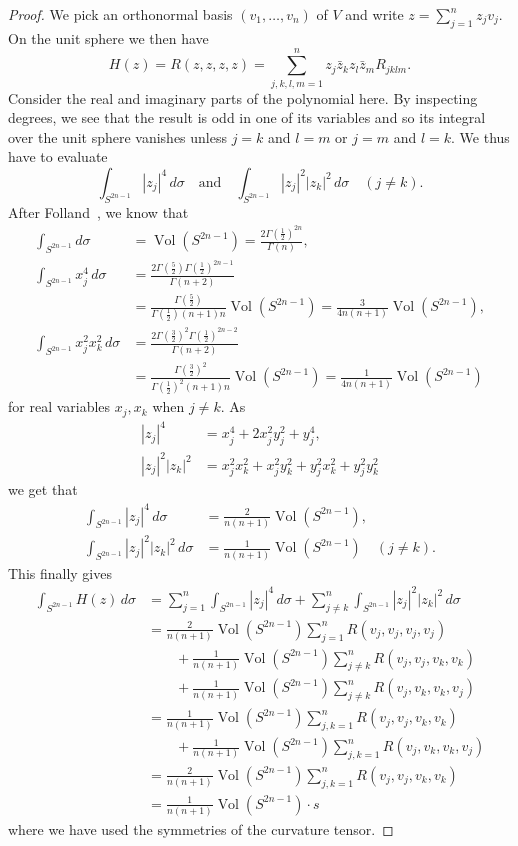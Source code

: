 \documentclass[11pt]{article}
\newtheorem*{proof}{Proof}
\DeclareMathOperator{\Vol}{Vol}
\begin{document}
\begin{proof}
  We pick an orthonormal basis $(v_1,\ldots,v_n)$ of $V$ and write $z = \sum_{j=1}^n z_j v_j$. On the unit sphere we then have
$$
H(z)
= R(z,z,z,z)
= \sum_{j,k,l,m=1}^n z_j \bar z_k z_l \bar z_m R_{jklm}.
$$
Consider the real and imaginary parts of the polynomial here. By inspecting degrees, we see that the result is odd in one of its variables and so its integral over the unit sphere vanishes unless $j = k$ and $l = m$ or $j = m$ and $l = k$. We thus have to evaluate
$$
\int_{S^{2n-1}} |z_j|^4 \, d\sigma
\quad\text{and}\quad
\int_{S^{2n-1}} |z_j|^2 |z_k|^2 \, d\sigma
\quad(j \not= k).
$$
After Folland~\cite{folland}, we know that
\begin{align*}
\int_{S^{2n-1}} d\sigma
&= \Vol(S^{2n-1}) = \frac{2\Gamma(\tfrac12)^{2n}}{\Gamma(n)},
\\
\int_{S^{2n-1}} x_j^4 \, d\sigma
&= \frac{2\Gamma(\tfrac 52)\Gamma(\tfrac 12)^{2n-1}}{\Gamma(n+2)}
\\
&= \frac{\Gamma(\tfrac52)}{\Gamma(\tfrac12)(n+1)n} \Vol(S^{2n-1})
= \frac{3}{4n(n+1)} \Vol(S^{2n-1}),
\\
\int_{S^{2n-1}} x_j^2 x_k^2 \, d\sigma
&= \frac{2\Gamma(\tfrac32)^2\Gamma(\tfrac 12)^{2n-2}}{\Gamma(n+2)}
\\
&= \frac{\Gamma(\tfrac32)^2}{\Gamma(\tfrac12)^2 (n+1)n} \Vol(S^{2n-1})
= \frac{1}{4n(n+1)} \Vol(S^{2n-1})
\end{align*}
for real variables $x_j, x_k$ when $j \not= k$. As
\begin{align*}
|z_j|^4 &= x_j^4 + 2 x_j^2 y_j^2 + y_j^4,
\\
|z_j|^2 |z_k|^2 &= x_j^2 x_k^2 + x_j^2 y_k^2 + y_j^2 x_k^2 + y_j^2 y_k^2
\end{align*}
we get that
\begin{align*}
\int_{S^{2n-1}} |z_j|^4 \, d\sigma
&= \frac{2}{n(n+1)} \Vol(S^{2n-1}),
\\
\int_{S^{2n-1}} |z_j|^2 |z_k|^2 \, d\sigma
&= \frac{1}{n(n+1)} \Vol(S^{2n-1})
\quad(j \not= k).
\end{align*}
This finally gives
\begin{align*}
\int_{S^{2n-1}} H(z) \,d\sigma
&= \sum_{j=1}^n \int_{S^{2n-1}} |z_j|^4 \, d\sigma
+ \sum_{j \not= k}^n \int_{S^{2n-1}} |z_j|^2|z_k|^2 \, d\sigma
\\
&= \frac{2}{n(n+1)} \Vol(S^{2n-1}) \sum_{j=1}^n R(v_j,v_j,v_j,v_j)
\\
&\qquad{}+ \frac{1}{n(n+1)} \Vol(S^{2n-1}) \sum_{j \not= k}^n R(v_j,v_j,v_k,v_k)
\\
&\qquad{}+
\frac{1}{n(n+1)} \Vol(S^{2n-1}) \sum_{j \not= k}^n R(v_j,v_k,v_k,v_j)
\\
&= \frac{1}{n(n+1)} \Vol(S^{2n-1}) \sum_{j,k=1}^n R(v_j,v_j,v_k,v_k)
\\
&\qquad{}+
\frac{1}{n(n+1)} \Vol(S^{2n-1}) \sum_{j,k=1}^n R(v_j,v_k,v_k,v_j)
\\
&= \frac{2}{n(n+1)} \Vol(S^{2n-1}) \sum_{j,k=1}^n R(v_j,v_j,v_k,v_k)
\\
&= \frac{1}{n(n+1)} \Vol(S^{2n-1}) \cdot s
\end{align*}
where we have used the symmetries of the curvature tensor.
\end{proof}
\end{document}

